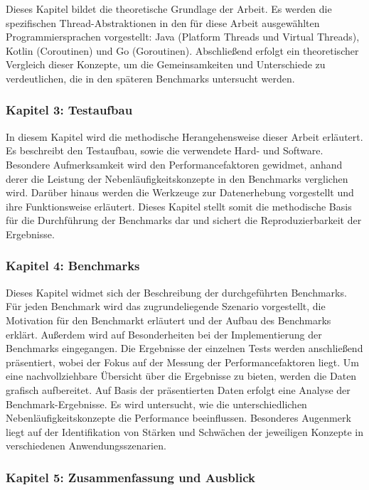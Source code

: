 \documentclass[fontsize=12pt,paper=a4,twoside=semi,parskip=half-,headsepline,headinclude]{scrreprt}
\begin{document}
Dieses Kapitel bildet die theoretische Grundlage der Arbeit. Es werden die spezifischen Thread-Abstraktionen in den für diese Arbeit ausgewählten Programmiersprachen vorgestellt: Java (Platform Threads und Virtual Threads), Kotlin (Coroutinen) und Go (Goroutinen). Abschließend erfolgt ein theoretischer Vergleich dieser Konzepte, um die Gemeinsamkeiten und Unterschiede zu verdeutlichen, die in den späteren Benchmarks untersucht werden.

\subsubsection{Kapitel 3: Testaufbau}

In diesem Kapitel wird die methodische Herangehensweise dieser Arbeit erläutert. Es beschreibt den Testaufbau, sowie die verwendete Hard- und Software. Besondere Aufmerksamkeit wird den Performancefaktoren gewidmet, anhand derer die Leistung der Neben\-läufig\-keits\-kon\-zep\-te in den Benchmarks verglichen wird. Darüber hinaus werden die Werkzeuge zur Datenerhebung vorgestellt und ihre Funktionsweise erläutert. Dieses Kapitel stellt somit die methodische Basis für die Durchführung der Benchmarks dar und sichert die Reproduzierbarkeit der Ergebnisse.

\subsubsection{Kapitel 4: Benchmarks}

Dieses Kapitel widmet sich der Beschreibung der durchgeführten Benchmarks. Für jeden Benchmark wird das zugrundeliegende Szenario vorgestellt, die Motivation für den Benchmarkt erläutert und der Aufbau des Benchmarks erklärt. Außerdem wird auf Besonderheiten bei der Implementierung der Benchmarks eingegangen. Die Ergebnisse der einzelnen Tests werden anschließend präsentiert, wobei der Fokus auf der Messung der Performancefaktoren liegt. Um eine nachvollziehbare Übersicht über die Ergebnisse zu bieten, werden die Daten grafisch aufbereitet. Auf Basis der präsentierten Daten erfolgt eine Analyse der Benchmark-Ergebnisse. Es wird untersucht, wie die unterschiedlichen Nebenläufigkeitskonzepte die Performance beeinflussen. Besonderes Augenmerk liegt auf der Identifikation von Stärken und Schwächen der jeweiligen Konzepte in verschiedenen Anwendungsszenarien.

\subsubsection{Kapitel 5: Zusammenfassung und Ausblick}
\end{document}
